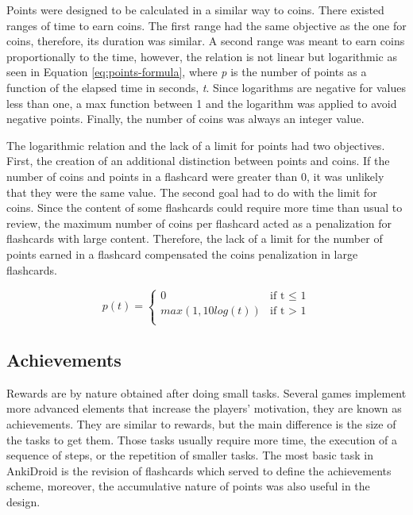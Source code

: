 Points were designed to be calculated in a similar way to coins. There existed ranges of time to earn coins. The first range had the same objective as the one for coins, therefore, its duration was similar. A second range was meant to earn coins proportionally to the time, however, the relation is not linear but logarithmic as seen in Equation \ref{eq:points-formula}, where \textit{p} is the number of points as a function of the elapsed time in seconds, \textit{t}. Since logarithms are negative for values less than one, a max function between 1 and the logarithm was applied to avoid negative points. Finally, the number of coins was always an integer value.

The logarithmic relation and the lack of a limit for points had two objectives. First, the creation of an additional distinction between points and coins. If the number of coins and points in a flashcard were greater than 0, it was unlikely that they were the same value. The second goal had to do with the limit for coins. Since the content of some flashcards could require more time than usual to review, the maximum number of coins per flashcard acted as a penalization for flashcards with large content. Therefore, the lack of a limit for the number of points earned in a flashcard compensated the coins penalization in large flashcards.

\begin{equation}
  p(t) =
      \begin{cases}
        0 & \text{if t $\leq$ 1}\\
        max(1, 10log(t)) & \text{if t $>$ 1}\\
      \end{cases}
    \label{eq:points-formula}
\end{equation}

\subsection{Achievements}
Rewards are by nature obtained after doing small tasks. Several games implement more advanced elements that increase the players' motivation, they are known as achievements. They are similar to rewards, but the main difference is the size of the tasks to get them. Those tasks usually require more time, the execution of a sequence of steps, or the repetition of smaller tasks. The most basic task in AnkiDroid is the revision of flashcards which served to define the achievements scheme, moreover, the accumulative nature of points was also useful in the design.


